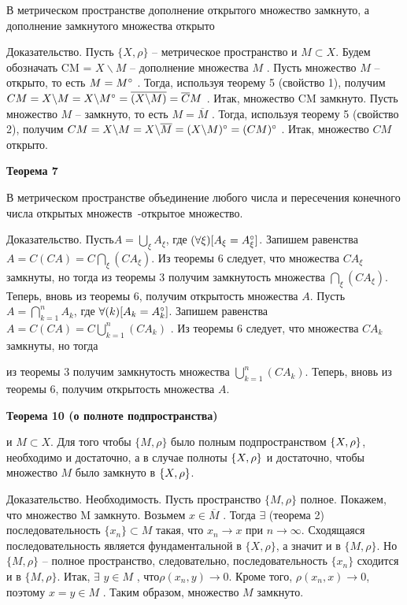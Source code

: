 {В метрическом пространстве дополнение открытого множество замкнуто,
а дополнение замкнутого множества открыто

Доказательство. Пусть $\{X, \rho\}$ – метрическое пространство и $M  \subset X$.
Будем обозначать CM = $X\backslash M$ – дополнение множества $M$ .
Пусть множество $M$ – открыто, то есть $M = M ^{\circ}$ .
Тогда, используя теорему 5 (свойство 1), получим $CM = X\backslash M = X\backslash M ^{\circ}
    = \overline {(X\backslash M )} = \overline CM$ .
Итак, множество CM замкнуто.
Пусть множество $M$ – замкнуто, то есть $M =\overline M$ .
Тогда, используя теорему 5 (свойство 2),
получим $CM = X\backslash M = X\backslash \overline M = (X\backslash M )^{\circ}  = (CM )^{\circ}$ .
Итак, множество $CM$ открыто.


\textbf{Теорема 7  }

В метрическом пространстве объединение любого числа и пересечения конечного числа
открытых множеств~-открытое множество.

Доказательство. Пусть$ A =\bigcup_\xi A_\xi $, где $(\forall\xi)[ A_\xi	= A_\xi^{\circ} ]$.
Запишем равенства
$A  = C(CA)  = C\bigcap_\xi	(CA_\xi )$. Из теоремы 6 следует, что множества $CA_\xi$
замкнуты, но тогда из теоремы 3 получим замкнутость множества	$\bigcap_\xi(CA_\xi)$.
Теперь, вновь из теоремы 6, получим открытость множества $A$.
Пусть $A = \bigcap^n_{k=1}A_k$, где $\forall(k)[ A_k  = A^{\circ}_k ]$.
Запишем равенства $A = C(CA) =C\bigcup^n_{k=1}(CA_k)$
. Из теоремы 6 следует, что множества $CA_k$ замкнуты, но тогда

из теоремы 3 получим замкнутость множества $\bigcup^n_{k=1}(CA_k)$.
Теперь, вновь из теоремы 6, получим открытость множества $A$.


\textbf{Теорема 10 (о полноте подпространства) }

\MS и $M \subset X$. Для того чтобы $ \{M, \rho\}$ было полным подпространством
$\{X, \rho\}$, необходимо и достаточно, а в случае полноты $\{X, \rho\}$ и достаточно, чтобы
множество $M$ было замкнуто в $\{X, \rho\}$.

Доказательство. Необходимость. Пусть пространство $\{M, \rho\}$ полное.
Покажем, что множество M замкнуто. Возьмем $x \in \overline M$ .
Тогда $\exists$ (теорема 2) последовательность $\{x_n\} \subset M$ такая, что
$x_n \to x$ при $n \to \infty$.
Сходящаяся последовательность является фундаментальной в $\{X, \rho\}$,
а значит и в $\{M, \rho\}$. Но $\{M, \rho\}$ –
полное пространство, следовательно,
последовательность $\{x_n\}$ сходится и в $\{M, \rho\}$.
Итак, $\exists$ $y \in M$ , что$ \rho(x_n, y) \to 0$.
Кроме того, $\rho(x_n, x) \to 0$, поэтому $x = y \in M$ .
Таким образом, множество $M$ замкнуто.

}
